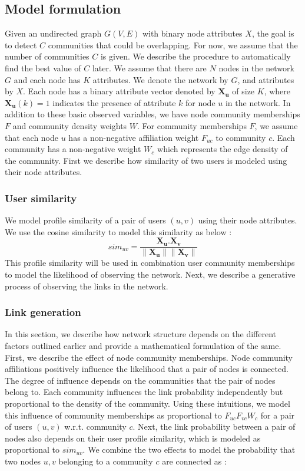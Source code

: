\documentclass[11pt]{article}
\begin{document}
\subsection{Model formulation}
Given an undirected graph $G(V,E)$ with binary node attributes $X$,  the goal is to detect $C$ communities that could be overlapping. For now, we assume that the number of communities $C$ is given.  We describe the procedure to automatically find the best value of $C$ later.
We assume that there are $N$ nodes in the network $G$ and each node has $K$ attributes. We denote the network by $G$, and attributes by $X$.
Each node has a binary attribute vector denoted by $\mathbf{X_u}$ of size $K$,  
where $\mathbf{X_u} (k) = 1$ indicates the presence of attribute $k$ for node $u$ in the network. In addition to these basic observed variables, we have node community memberships $F$ and community density weights $W$. For community memberships $F$, we assume that each node $u$ has a non-negative affiliation weight $F_{uc}$ to community $c$. Each community has a non-negative weight $W_c$ which represents the edge density of the community. First we describe how similarity of two users is modeled using their node attributes. 

\subsubsection*{User similarity}
We model profile similarity of a pair of users $(u,v)$ using their node attributes. We use the cosine similarity to model this similarity as below : 
\[ sim_{uv} = \frac{\mathbf{X_u} \textbf{.} \mathbf{X_v} }{\| \mathbf{X_u}\| \|  \mathbf{X_v} \|}\]
This profile similarity will be used in combination user community memberships to model the likelihood of observing the network. Next, we describe a generative process of observing the links in the network.
\subsubsection*{Link generation}
In this section, we  describe how network structure depends on the different factors  outlined earlier and provide a mathematical formulation of the same.  First, we describe the effect of node community memberships.
Node community affiliations positively influence the likelihood that a pair of nodes is connected. The degree of influence depends on the communities that the pair of nodes belong to. Each community influences the link probability independently but proportional to the density of the community. Using these intuitions, we model this influence of community memberships as proportional to $F_{uc} F_{vc} W_c$ for a pair of users $(u,v)$ w.r.t. community $c$.
Next, the link probability between a pair of nodes also depends on their user profile similarity, which is modeled as proportional to $sim_{uv}$.  We combine the two effects to model the probability that two nodes $u, v$ belonging to a community $c$ are connected as : 
\end{document}
